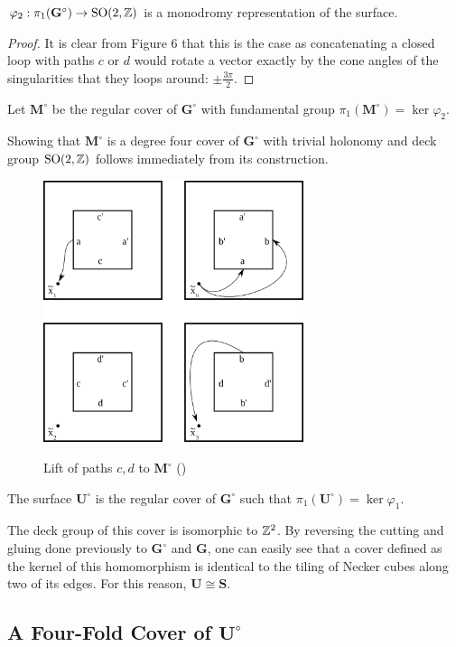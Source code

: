 \documentclass[]{article}
\def\bU{\mathbf{U}} \def\btU{\tilde{\bU}} \def\bUs{\bU^\circ}
\def\bG{\mathbf{G}} \def\bGs{\mathbf{G}^\circ}
\def\bMs{\mathbf{M}^\circ}
\def\SO{\mathrm{SO}}
\begin{document}
\begin{lem}
$\varphi_2:\pi_1(\bGs)\rightarrow \mathrm{SO}(2,\ZZ)$ is a monodromy representation of the surface.
\begin{proof}
It is clear from Figure 6 that this is the case as concatenating a closed loop with paths $c$ or $d$ would rotate a vector exactly by the cone angles of the singularities that they loops around: $\pm \frac{3\pi}{2}$.
\end{proof}
\end{lem}

\begin{Def}
Let $\bMs$ be the regular cover of $\bGs$ with fundamental group $\pi_1(\bMs)=\ker\varphi_2$.
\end{Def}
Showing that $\bMs$ is a degree four cover of $\bGs$ with trivial holonomy and deck group $\SO(2,\ZZ)$ follows immediately from its construction.
\begin{figure}[H]
\centering
\includegraphics[width=3in]{monogroup.png}
\label{fig:arbitrarylift}
\caption{Lift of paths $c,d$ to $\bMs$ ()}
\end{figure}

\begin{Def}
The surface $\bUs$ is the regular cover of $\bGs$ such that $\pi_1(\bUs)=\ker\varphi_1$. 
\end{Def}

The deck group of this cover is isomorphic to $\mathbb{Z}^2$. By reversing the cutting and gluing done previously to $\bGs$ and $\bG$, one can easily see that a cover defined as the kernel of this homomorphism is identical to the tiling of Necker cubes along two of its edges. For this reason, $\bU\cong\mathbf{S}$. 



\subsection{A Four-Fold Cover of $\bUs$}
\end{document}
